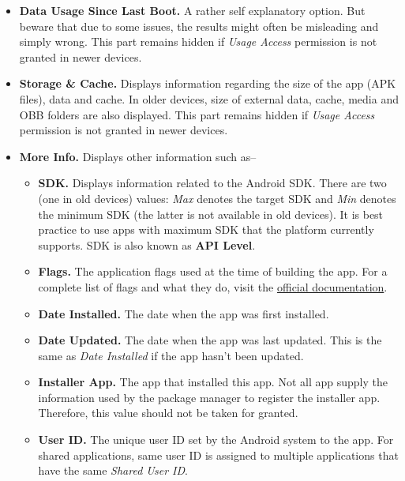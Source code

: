 \begin{itemize}
    \item \textbf{Data Usage Since Last Boot.} A rather self explanatory option. But beware that due to some issues, the
    results might often be misleading and simply wrong. This part remains hidden if \textit{Usage Access} permission is
    not granted in newer devices.

    \item \textbf{Storage \& Cache.} Displays information regarding the size of the app (APK files), data and cache. In
    older devices, size of external data, cache, media and OBB folders are also displayed. This part remains hidden if
    \textit{Usage Access} permission is not granted in newer devices.

    \item \textbf{More Info.} Displays other information such as--
    \begin{itemize}
        \item \textbf{SDK.} Displays information related to the Android SDK. There are two (one in old devices) values:
        \textit{Max} denotes the target SDK and \textit{Min} denotes the minimum SDK (the latter is not available in old
        devices). It is best practice to use apps with maximum SDK that the platform currently supports. SDK is also
        known as \textbf{API Level}.

        \item \textbf{Flags.} The application flags used at the time of building the app. For a complete list of flags
        and what they do, visit the
        \href{https://developer.android.com/reference/android/content/pm/ApplicationInfo\#flags}{official documentation}.

        \item \textbf{Date Installed.} The date when the app was first installed.

        \item \textbf{Date Updated.} The date when the app was last updated. This is the same as \textit{Date Installed}
        if the app hasn't been updated.

        \item \textbf{Installer App.} The app that installed this app. Not all app supply the information used by the
        package manager to register the installer app. Therefore, this value should not be taken for granted.

        \item \textbf{User ID.} The unique user ID set by the Android system to the app. For shared applications, same
        user ID is assigned to multiple applications that have the same \textit{Shared User ID}.


\end{itemize}
\end{itemize}
